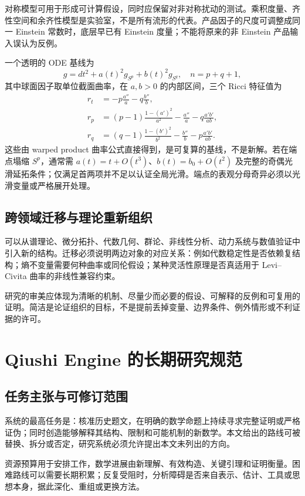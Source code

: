 \documentclass[11pt,a4paper]{article}
\theoremstyle{definition}
\begin{document}
对称模型可用于形成可计算假设，同时应保留对非对称扰动的测试。乘积度量、齐性空间和余齐性模型是实验室，不是所有流形的代表。产品因子的尺度可调整成同一 Einstein 常数时，底层早已有 Einstein 度量；不能将原来的非 Einstein 产品输入误认为反例。

一个透明的 ODE 基线为
\[
g=dt^2+a(t)^2g_{S^p}+b(t)^2g_{S^q},\quad n=p+q+1,
\]
其中球面因子取单位截面曲率，在 $a,b>0$ 的内部区间，三个 Ricci 特征值为
\begin{align*}
r_t&=-p\frac{a''}{a}-q\frac{b''}{b},\\
r_p&=(p-1)\frac{1-(a')^2}{a^2}-\frac{a''}{a}
-q\frac{a'b'}{ab},\\
r_q&=(q-1)\frac{1-(b')^2}{b^2}-\frac{b''}{b}
-p\frac{a'b'}{ab}.
\end{align*}
这些由 warped product 曲率公式直接得到，是可复算的基线，不是新解。若在端点塌缩 $S^p$，通常需 $a(t)=t+O(t^3)$、$b(t)=b_0+O(t^2)$ 及完整的奇偶光滑延拓条件；仅满足首两项并不足以认证全局光滑。端点的表观分母奇异必须以光滑变量或严格展开处理。

\subsection{跨领域迁移与理论重新组织}

可以从谱理论、微分拓扑、代数几何、群论、非线性分析、动力系统与数值验证中引入新的结构。迁移必须说明两边对象的对应关系：例如代数稳定性是否依赖复结构；熵不变量需要何种曲率或同伦假设；某种灵活性原理是否真适用于 Levi--Civita 曲率的非线性兼容约束。

研究的审美应体现为清晰的机制、尽量少而必要的假设、可解释的反例和可复用的证明。简洁是论证组织的目标，不是提前丢掉变量、边界条件、例外情形或不利证据的许可。

\section{Qiushi Engine 的长期研究规范}\label{sec:engine}

\subsection{任务主张与可修订范围}

系统的最高任务是：核准历史题文，在明确的数学命题上持续寻求完整证明或严格证伪；同时创造能够解释其结构、限制和可能机制的新数学。本文给出的路线可被替换、拆分或否定，研究系统必须允许提出本文未列出的方向。

资源预算用于安排工作，数学进展由新理解、有效构造、关键引理和证明衡量。困难路线可以需要长期积累；反复受阻时，分析障碍是否来自表示、估计、工具或思想本身，据此深化、重组或更换方法。
\end{document}
